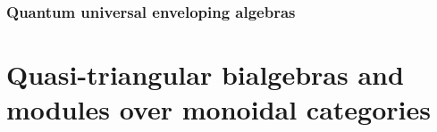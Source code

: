             \begin{definition} \label{}
                
            \end{definition}
        
        \subsubsection{Quantum universal enveloping algebras}
        
\section{Quasi-triangular bialgebras and modules over monoidal categories}
    